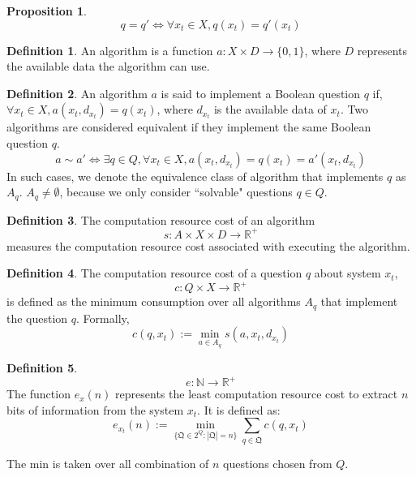 \documentclass[11pt,a4paper]{article}
\newtheorem{pro}{Proposition}[section]
\theoremstyle{definition}
\newtheorem{defn}{Definition}[section]
\theoremstyle{remark}
\numberwithin{equation}{section}
\newcommand{\Real}{\mathbb R}
\newcommand{\Natural}{\mathbb N}
\begin{document}
\begin{pro}
\begin{equation}
q=q' \iff  \forall x_t \in X, q(x_t) = q'(x_t)
\end{equation}
\end{pro}

\begin{defn}
An algorithm is a function \( a: X \times D \rightarrow \{0, 1\} \), where \( D \) represents the available data the algorithm can use.
\end{defn}
\begin{defn}
An algorithm \( a \) is said to implement a Boolean question \( q \) if, $\forall  x_t \in X , a(x_t, d_{x_t}) = q(x_t) $, where $d_{x_t}$ is the available data of $x_t$.
Two algorithms are considered equivalent if they implement the same Boolean question $q$. 
\begin{equation}
a \sim a' \iff  
\exists q\in Q, \forall  x_t \in X , a(x_t, d_{x_t}) = q(x_t)  =a'(x_t, d_{x_t})
\end{equation}
In such cases, we denote the equivalence class of algorithm that implements $q$ as \( A_q \).
$A_q \neq \emptyset$, because we only consider ``solvable" questions $q\in Q$. 

\end{defn}

\begin{defn}
The computation resource cost of an algorithm 
\begin{equation}
s: A \times X \times D  \rightarrow \mathbb{R}^+ 
\end{equation}
 measures the computation resource cost associated with executing the algorithm.
 \end{defn}




\begin{defn}
The computation resource cost of a question $q$ about system $x_t$,
\begin{equation}
c: Q \times X  \rightarrow \mathbb{R}^+ 
\end{equation}
is defined as the minimum consumption over all algorithms \( A_q \) that implement the question \( q \).
Formally, 
\begin{equation}
 c(q,x_t)  := \min_{a \in A_q } s(a,x_t,d_{x_t}) 
\end{equation}

\end{defn}

\begin{defn}
\begin{equation}
e:\Natural \rightarrow \Real^+
\end{equation}
The function \( e_x(n) \) represents the least computation resource cost to extract \( n \) bits of information from the system \( x_t \).
It is defined as:
\begin{equation}
e_{x_t}(n) := \min_{\{\mathfrak{Q} \in 2^Q : |\mathfrak{Q}| = n\}} \sum_{q \in \mathfrak{Q}} c(q,x_t)
\end{equation}

The min is taken over all combination of $n$ questions chosen from \( Q \). 
\end{defn}
\end{document}
